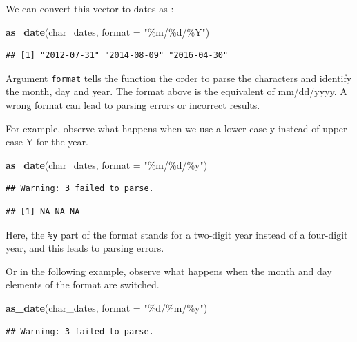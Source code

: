 \documentclass[
]{article}
\newenvironment{Shaded}{\begin{snugshade}}{\end{snugshade}}
\newcommand{\AttributeTok}[1]{\textcolor[rgb]{0.13,0.29,0.53}{#1}}
\newcommand{\FunctionTok}[1]{\textcolor[rgb]{0.13,0.29,0.53}{\textbf{#1}}}
\newcommand{\NormalTok}[1]{#1}
\newcommand{\StringTok}[1]{\textcolor[rgb]{0.31,0.60,0.02}{#1}}
\begin{document}
We can convert this vector to dates as :

\begin{Shaded}
\begin{Highlighting}[]
\FunctionTok{as\_date}\NormalTok{(char\_dates, }\AttributeTok{format =} \StringTok{"\%m/\%d/\%Y"}\NormalTok{)}
\end{Highlighting}
\end{Shaded}

\begin{verbatim}
## [1] "2012-07-31" "2014-08-09" "2016-04-30"
\end{verbatim}

Argument \texttt{format} tells the function the order to parse the
characters and identify the month, day and year. The format above is the
equivalent of mm/dd/yyyy. A wrong format can lead to parsing errors or
incorrect results.

For example, observe what happens when we use a lower case y instead of
upper case Y for the year.

\begin{Shaded}
\begin{Highlighting}[]
\FunctionTok{as\_date}\NormalTok{(char\_dates, }\AttributeTok{format =} \StringTok{"\%m/\%d/\%y"}\NormalTok{)}
\end{Highlighting}
\end{Shaded}

\begin{verbatim}
## Warning: 3 failed to parse.
\end{verbatim}

\begin{verbatim}
## [1] NA NA NA
\end{verbatim}

Here, the \texttt{\%y} part of the format stands for a two-digit year
instead of a four-digit year, and this leads to parsing errors.

Or in the following example, observe what happens when the month and day
elements of the format are switched.

\begin{Shaded}
\begin{Highlighting}[]
\FunctionTok{as\_date}\NormalTok{(char\_dates, }\AttributeTok{format =} \StringTok{"\%d/\%m/\%y"}\NormalTok{)}
\end{Highlighting}
\end{Shaded}

\begin{verbatim}
## Warning: 3 failed to parse.
\end{verbatim}
\end{document}
